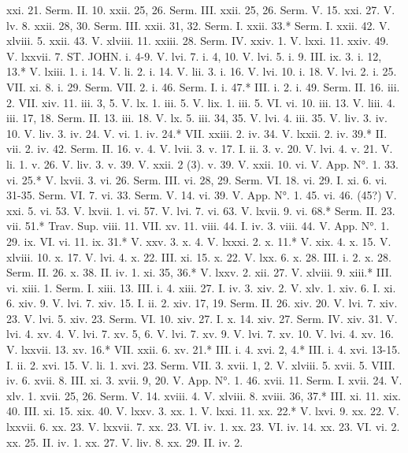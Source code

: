 xxi. 21.	Serm. II. 10.
xxii. 25, 26.	Serm. III.
xxii. 25, 26.	Serm. V. 15.
xxi. 27.	V. lv. 8.
xxii. 28, 30.	Serm. III.
xxii. 31, 32.	Serm. I.
xxii. 33.*	Serm. I.
xxii. 42.	V. xlviii. 5.
xxii. 43.	V. xlviii. 11.
xxiii. 28.	Serm. IV.
xxiv. 1.	V. lxxi. 11.
xxiv. 49.	V. lxxvii. 7.
ST. JOHN.
i. 4-9.	V. lvi. 7.
i. 4, 10.	V. lvi. 5.
i. 9.	III. ix. 3.
i. 12, 13.*	V. lxiii. 1.
i. 14.	V. li. 2.
i. 14.	V. lii. 3.
i. 16.	V. lvi. 10.
i. 18.	V. lvi. 2.
i. 25.	VII. xi. 8.
i. 29.	Serm. VII. 2.
i. 46.	Serm. I.
i. 47.*	III. i. 2.
i. 49.	Serm. II. 16.
iii. 2.	VII. xiv. 11.
iii. 3, 5.	V. lx. 1.
iii. 5.	V. lix. 1.
iii. 5.	VI. vi. 10.
iii. 13.	V. liii. 4.
iii. 17, 18.	Serm. II. 13.
iii. 18.	V. lx. 5.
iii. 34, 35.	V. lvi. 4.
iii. 35.	V. liv. 3.
iv. 10.	V. liv. 3.
iv. 24.	V. vi. 1.
iv. 24.*	VII. xxiii. 2.
iv. 34.	V. lxxii. 2.
iv. 39.*	II. vii. 2.
iv. 42.	Serm. II. 16.
v. 4.	V. lvii. 3.
v. 17.	I. ii. 3.
v. 20.	V. lvi. 4.
v. 21.	V. li. 1.
v. 26.	V. liv. 3.
v. 39.	V. xxii. 2 (3).
v. 39.	V. xxii. 10.
vi.	V. App. N°. 1. 33.
vi. 25.*	V. lxvii. 3.
vi. 26.	Serm. III.
vi. 28, 29.	Serm. VI. 18.
vi. 29.	I. xi. 6.
vi. 31-35.	Serm. VI. 7.
vi. 33.	Serm. V. 14.
vi. 39.	V. App. N°. 1. 45.
vi. 46. (45?)	V. xxi. 5.
vi. 53.	V. lxvii. 1.
vi. 57.	V. lvi. 7.
vi. 63.	V. lxvii. 9.
vi. 68.*	Serm. II. 23.
vii. 51.*	Trav. Sup.
viii. 11.	VII. xv. 11.
viii. 44.	I. iv. 3.
viii. 44.	V. App. N°. 1. 29.
ix.	VI. vi. 11.
ix. 31.*	V. xxv. 3.
x. 4.	V. lxxxi. 2.
x. 11.*	V. xix. 4.
x. 15.	V. xlviii. 10.
x. 17.	V. lvi. 4.
x. 22.	III. xi. 15.
x. 22.	V. lxx. 6.
x. 28.	III. i. 2.
x. 28.	Serm. II. 26.
x. 38.	II. iv. 1.
xi. 35, 36.*	V. lxxv. 2.
xii. 27.	V. xlviii. 9.
xiii.*	III. vi.
xiii. 1.	Serm. I.
xiii. 13.	III. i. 4.
xiii. 27.	I. iv. 3.
xiv. 2.	V. xlv. 1.
xiv. 6.	I. xi. 6.
xiv. 9.	V. lvi. 7.
xiv. 15.	I. ii. 2.
xiv. 17, 19.	Serm. II. 26.
xiv. 20.	V. lvi. 7.
xiv. 23.	V. lvi. 5.
xiv. 23.	Serm. VI. 10.
xiv. 27.	I. x. 14.
xiv. 27.	Serm. IV.
xiv. 31.	V. lvi. 4.
xv. 4.	V. lvi. 7.
xv. 5, 6.	V. lvi. 7.
xv. 9.	V. lvi. 7.
xv. 10.	V. lvi. 4.
xv. 16.	V. lxxvii. 13.
xv. 16.*	VII. xxii. 6.
xv. 21.*	III. i. 4.
xvi. 2, 4.*	III. i. 4.
xvi. 13-15.	I. ii. 2.
xvi. 15.	V. li. 1.
xvi. 23.	Serm. VII. 3.
xvii. 1, 2.	V. xlviii. 5.
xvii. 5.	VIII. iv. 6.
xvii. 8.	III. xi. 3.
xvii. 9, 20.	V. App. N°. 1. 46.
xvii. 11.	Serm. I.
xvii. 24.	V. xlv. 1.
xvii. 25, 26.	Serm. V. 14.
xviii. 4.	V. xlviii. 8.
xviii. 36, 37.*	III. xi. 11.
xix. 40.	III. xi. 15.
xix. 40.	V. lxxv. 3.
xx. 1.	V. lxxi. 11.
xx. 22.*	V. lxvi. 9.
xx. 22.	V. lxxvii. 6.
xx. 23.	V. lxxvii. 7.
xx. 23.	VI. iv. 1.
xx. 23.	VI. iv. 14.
xx. 23.	VI. vi. 2.
xx. 25.	II. iv. 1.
xx. 27.	V. liv. 8.
xx. 29.	II. iv. 2.
